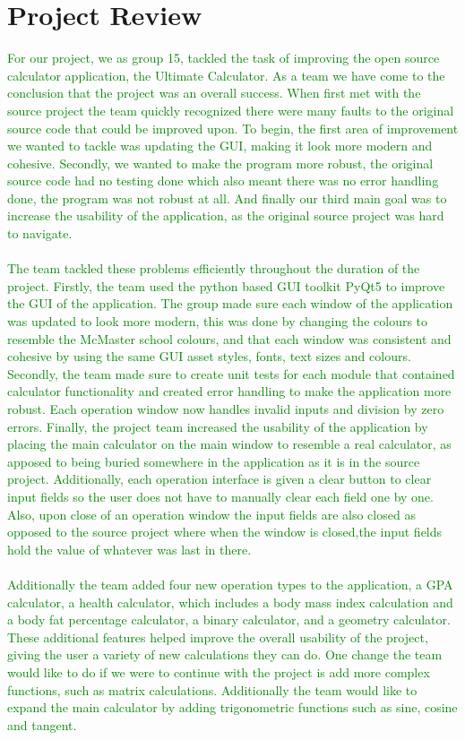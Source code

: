 \documentclass{article}
\begin{document}
\section{Project Review}
\textcolor{Green}{For our project, we as group 15, tackled the task of improving the open source calculator application, the Ultimate Calculator. As a team we have come to the conclusion that the project was an overall success. When first met with the source project the team quickly recognized there were many faults to the original source code that could be improved upon. To begin, the first area of improvement we wanted to tackle was updating the GUI, making it look more modern and cohesive. Secondly, we wanted to make the program more robust, the original source code had no testing done which also meant there was no error handling done, the program was not robust at all. And finally our third main goal was to increase the usability of the application, as the original source project was hard to navigate.}
\\ \\
\textcolor{Green}{The team tackled these problems efficiently throughout the duration of the project. Firstly, the team used the python based GUI toolkit PyQt5 to improve the GUI of the application. The group made sure each window of the application was updated to look more modern, this was done by changing the colours to resemble the McMaster school colours, and that each window was consistent and cohesive by using the same GUI asset styles, fonts, text sizes and colours. Secondly, the team made sure to create unit tests for each module that contained calculator functionality and created error handling to make the application more robust. Each operation window now handles invalid inputs and division by zero errors. Finally, the project team increased the usability of the application by placing the main calculator on the main window to resemble a real calculator, as apposed to being buried somewhere in the application as it is in the source project. Additionally, each operation interface is given a clear button to clear input fields so the user does not have to manually clear each field one by one. Also, upon close of an operation window the input fields are also closed as opposed to the source project where when the window is closed,the input fields hold the value of whatever was last in there.}
\\ \\
\textcolor{Green}{Additionally the team added four new operation types to the application, a GPA calculator, a health calculator, which includes a body mass index calculation and a body fat percentage calculator, a binary calculator, and a geometry calculator. These additional features helped improve the overall usability of the project, giving the user a variety of new calculations they can do. One change the team would like to do if we were to continue with the project is add more complex functions, such as matrix calculations. Additionally the team would like to expand the main calculator by adding trigonometric functions such as sine, cosine and tangent.}
\end{document}
